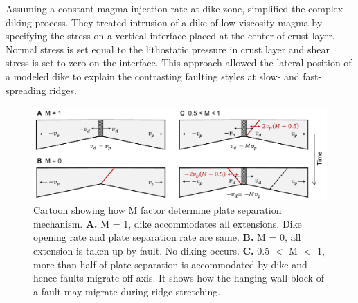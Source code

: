 \documentclass[letterpaper,12pt,notitle]{memphisthesis}                     %
\begin{document}
Assuming a constant magma injection rate at dike zone, \citet{Buck1998} simplified the complex diking process. They treated intrusion of a dike of low viscosity magma by specifying the stress on a vertical interface placed at the center of crust layer. Normal stress is set equal to the lithostatic pressure in crust layer and shear stress is set to zero on the interface.
This approach allowed the lateral position of a modeled dike to explain the contrasting faulting styles at slow- and fast-spreading ridges.

\begin{figure}[!htb]
    \centering
    \includegraphics[width=0.99\linewidth]{./figs/mfactor.pdf}
    \caption{Cartoon showing how M factor determine plate separation mechanism. \textbf{A.} M = 1, dike accommodates all extensions. Dike opening rate and plate separation rate are same. \textbf{B.} M = 0, all extension is taken up by fault. No diking occurs. \textbf{C.} 0.5 $<$ M $<$ 1, more than half of plate separation is accommodated by dike and hence faults migrate off axis. It shows how the hanging-wall block of a fault may migrate during ridge stretching.}
    \label{fig:mcartoon}
\end{figure}
\end{document}
